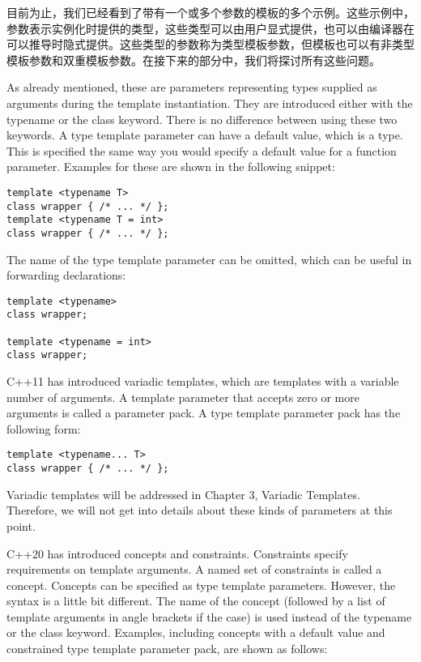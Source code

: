 
目前为止，我们已经看到了带有一个或多个参数的模板的多个示例。这些示例中，参数表示实例化时提供的类型，这些类型可以由用户显式提供，也可以由编译器在可以推导时隐式提供。这些类型的参数称为类型模板参数，但模板也可以有非类型模板参数和双重模板参数。在接下来的部分中，我们将探讨所有这些问题。


As already mentioned, these are parameters representing types supplied as arguments during the template instantiation. They are introduced either with the typename or the class keyword. There is no difference between using these two keywords. A type template parameter can have a default value, which is a type. This is specified the same way you would specify a default value for a function parameter. Examples for these are shown in the following snippet:

\begin{lstlisting}[style=styleCXX]
template <typename T>
class wrapper { /* ... */ };
template <typename T = int>
class wrapper { /* ... */ };
\end{lstlisting}

The name of the type template parameter can be omitted, which can be useful in forwarding declarations:

\begin{lstlisting}[style=styleCXX]
template <typename>
class wrapper;

template <typename = int>
class wrapper;
\end{lstlisting}

C++11 has introduced variadic templates, which are templates with a variable number of arguments. A template parameter that accepts zero or more arguments is called a parameter pack. A type template parameter pack has the following form:

\begin{lstlisting}[style=styleCXX]
template <typename... T>
class wrapper { /* ... */ };
\end{lstlisting}

Variadic templates will be addressed in Chapter 3, Variadic Templates. Therefore, we will not get into details about these kinds of parameters at this point.

C++20 has introduced concepts and constraints. Constraints specify requirements on template arguments. A named set of constraints is called a concept. Concepts can be specified as type template parameters. However, the syntax is a little bit different. The name of the concept (followed by a list of template arguments in angle brackets if the case) is used instead of the typename or the class keyword. Examples, including concepts with a default value and constrained type template parameter pack, are shown as follows:

